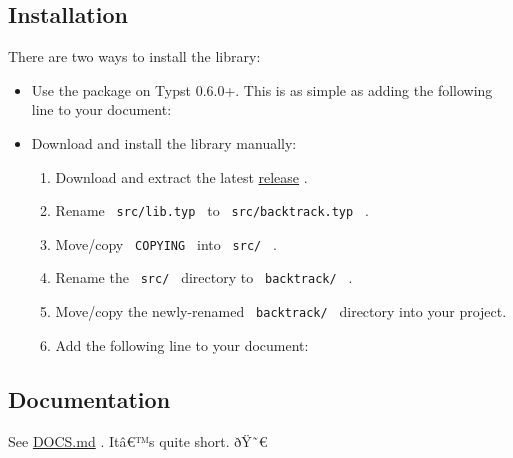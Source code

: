 \subsection{Installation}\label{installation}

There are two ways to install the library:

\begin{itemize}
\item
  Use the package on Typst 0.6.0+. This is as simple as adding the
  following line to your document:

\begin{Shaded}
\begin{Highlighting}[]
\end{Highlighting}
\end{Shaded}
\item
  Download and install the library manually:

  \begin{enumerate}
  \item
    Download and extract the latest
    \href{https://github.com/TheLukeGuy/backtrack/releases}{release} .
  \item
    Rename \texttt{\ src/lib.typ\ } to \texttt{\ src/backtrack.typ\ } .
  \item
    Move/copy \texttt{\ COPYING\ } into \texttt{\ src/\ } .
  \item
    Rename the \texttt{\ src/\ } directory to \texttt{\ backtrack/\ } .
  \item
    Move/copy the newly-renamed \texttt{\ backtrack/\ } directory into
    your project.
  \item
    Add the following line to your document:

\begin{Shaded}
\begin{Highlighting}[]
\end{Highlighting}
\end{Shaded}
  \end{enumerate}
\end{itemize}

\subsection{Documentation}\label{documentation}

See
\href{https://github.com/typst/packages/raw/main/packages/preview/backtrack/1.0.0/DOCS.md}{DOCS.md}
. Itâ€™s quite short. ðŸ˜€

